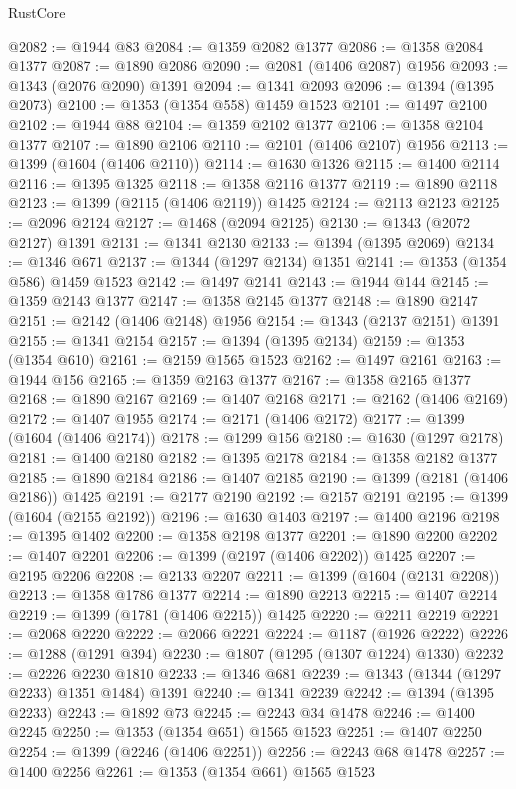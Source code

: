 \begin{lexlean}{RustCore}
\begin{coremodule}
{\begin{coremodule}
{{{{{{{{{{{{{{{{{{{{{{{{{{{{{{{{{{{{{{{{{{{{@2082 := @1944 @83
@2084 := @1359 @2082 @1377
@2086 := @1358 @2084 @1377
@2087 := @1890 @2086
@2090 := @2081 (@1406 @2087) @1956
@2093 := @1343 (@2076 @2090) @1391
@2094 := @1341 @2093
@2096 := @1394 (@1395 @2073)
@2100 := @1353 (@1354 @558) @1459 @1523
@2101 := @1497 @2100
@2102 := @1944 @88
@2104 := @1359 @2102 @1377
@2106 := @1358 @2104 @1377
@2107 := @1890 @2106
@2110 := @2101 (@1406 @2107) @1956
@2113 := @1399 (@1604 (@1406 @2110))
@2114 := @1630 @1326
@2115 := @1400 @2114
@2116 := @1395 @1325
@2118 := @1358 @2116 @1377
@2119 := @1890 @2118
@2123 := @1399 (@2115 (@1406 @2119)) @1425
@2124 := @2113 @2123
@2125 := @2096 @2124
@2127 := @1468 (@2094 @2125)
@2130 := @1343 (@2072 @2127) @1391
@2131 := @1341 @2130
@2133 := @1394 (@1395 @2069)
@2134 := @1346 @671
@2137 := @1344 (@1297 @2134) @1351
@2141 := @1353 (@1354 @586) @1459 @1523
@2142 := @1497 @2141
@2143 := @1944 @144
@2145 := @1359 @2143 @1377
@2147 := @1358 @2145 @1377
@2148 := @1890 @2147
@2151 := @2142 (@1406 @2148) @1956
@2154 := @1343 (@2137 @2151) @1391
@2155 := @1341 @2154
@2157 := @1394 (@1395 @2134)
@2159 := @1353 (@1354 @610)
@2161 := @2159 @1565 @1523
@2162 := @1497 @2161
@2163 := @1944 @156
@2165 := @1359 @2163 @1377
@2167 := @1358 @2165 @1377
@2168 := @1890 @2167
@2169 := @1407 @2168
@2171 := @2162 (@1406 @2169)
@2172 := @1407 @1955
@2174 := @2171 (@1406 @2172)
@2177 := @1399 (@1604 (@1406 @2174))
@2178 := @1299 @156
@2180 := @1630 (@1297 @2178)
@2181 := @1400 @2180
@2182 := @1395 @2178
@2184 := @1358 @2182 @1377
@2185 := @1890 @2184
@2186 := @1407 @2185
@2190 := @1399 (@2181 (@1406 @2186)) @1425
@2191 := @2177 @2190
@2192 := @2157 @2191
@2195 := @1399 (@1604 (@2155 @2192))
@2196 := @1630 @1403
@2197 := @1400 @2196
@2198 := @1395 @1402
@2200 := @1358 @2198 @1377
@2201 := @1890 @2200
@2202 := @1407 @2201
@2206 := @1399 (@2197 (@1406 @2202)) @1425
@2207 := @2195 @2206
@2208 := @2133 @2207
@2211 := @1399 (@1604 (@2131 @2208))
@2213 := @1358 @1786 @1377
@2214 := @1890 @2213
@2215 := @1407 @2214
@2219 := @1399 (@1781 (@1406 @2215)) @1425
@2220 := @2211 @2219
@2221 := @2068 @2220
@2222 := @2066 @2221
@2224 := @1187 (@1926 @2222)
@2226 := @1288 (@1291 @394)
@2230 := @1807 (@1295 (@1307 @1224) @1330)
@2232 := @2226 @2230 @1810
@2233 := @1346 @681
@2239 := @1343 (@1344 (@1297 @2233) @1351 @1484) @1391
@2240 := @1341 @2239
@2242 := @1394 (@1395 @2233)
@2243 := @1892 @73
@2245 := @2243 @34 @1478
@2246 := @1400 @2245
@2250 := @1353 (@1354 @651) @1565 @1523
@2251 := @1407 @2250
@2254 := @1399 (@2246 (@1406 @2251))
@2256 := @2243 @68 @1478
@2257 := @1400 @2256
@2261 := @1353 (@1354 @661) @1565 @1523
}}}}}}}}}}}}}}}}}}}}}}}}}}}}}}}}}}}}}}}}}}}}
\end{coremodule}}
\end{coremodule}
\end{lexlean}
